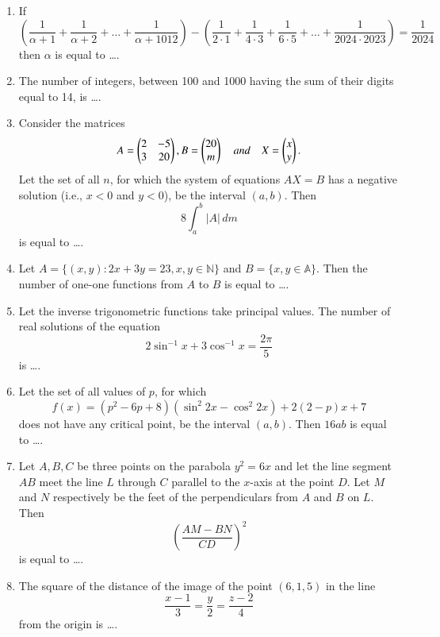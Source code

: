 \documentclass[journal]{IEEEtran}
\numberwithin{figure}{enumi}
\begin{document}
\begin{enumerate}
\item If
\begin{equation*}
\left( \frac{1}{\alpha + 1} + \frac{1}{\alpha + 2} + \ldots + \frac{1}{\alpha + 1012} \right) 
- \left( \frac{1}{2 \cdot 1} + \frac{1}{4 \cdot 3} + \frac{1}{6 \cdot 5} + \ldots + \frac{1}{2024 \cdot 2023} \right) 
= \frac{1}{2024}
\end{equation*}
then $\alpha$ is equal to \dots.

\item The number of integers, between 100 and 1000 having the sum of their digits equal to 14, is \dots.

\item Consider the matrices 
\begin{equation*}
A = \begin{pmatrix} 2 & -5 \\ 3 & 20 \end{pmatrix},B=\begin{pmatrix}20 \\ m\end{pmatrix}\quad and\quad X = \begin{pmatrix} x \\ y \end{pmatrix}.
\end{equation*}
Let the set of all $n$, for which the system of equations $AX = B$ has a negative solution (i.e., $x < 0$ and $y < 0$), be the interval $(a, b)$. Then 
\begin{equation*}
8\int_a^b  |A|\, dm
\end{equation*}
is equal to \dots.
\item Let $A = \{(x, y): 2x + 3y = 23, x, y \in \mathbb{N}\}$ and $B = \{x, y \in \mathbb{A}\}$. Then the number of one-one functions from $A$ to $B$ is equal to \dots.

\item Let the inverse trigonometric functions take principal values. The number of real solutions of the equation 
\begin{equation*}
2\sin^{-1} x + 3\cos^{-1} x = \frac{2\pi}{5}
\end{equation*}
is \dots.

\item Let the set of all values of $p$, for which 
\begin{equation*}
f(x) = (p^2 - 6p + 8)(\sin^2 2x - \cos^2 2x) + 2(2 - p)x + 7
\end{equation*}
does not have any critical point, be the interval $(a, b)$. Then $16ab$ is equal to \dots.

\item Let $A, B, C$ be three points on the parabola $y^2 = 6x$ and let the line segment $AB$ meet the line $L$ through $C$ parallel to the $x$-axis at the point $D$. Let $M$ and $N$ respectively be the feet of the perpendiculars from $A$ and $B$ on $L$. Then 
\begin{equation*}
\left(\frac{AM - BN}{CD}\right)^2
\end{equation*}
is equal to \dots.

\item The square of the distance of the image of the point $(6, 1, 5)$ in the line 
\begin{equation*}
\frac{x - 1}{3} = \frac{y}{2} = \frac{z - 2}{4}
\end{equation*}
from the origin is \dots.

\end{enumerate}
\end{document}
